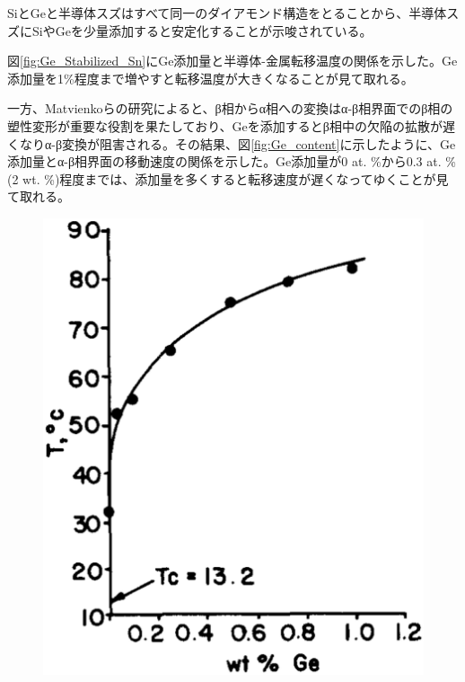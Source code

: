 SiとGeと半導体スズはすべて同一のダイアモンド構造をとることから、半導体スズにSiやGeを少量添加すると安定化することが示唆されている\cite{Ewald1954,Gallerneault1983}。

図\ref{fig:Ge_Stabilized_Sn}にGe添加量と半導体-金属転移温度の関係を示した\cite{Vnuk1984}。Ge添加量を1\%程度まで増やすと転移温度が大きくなることが見て取れる。

一方、Matvienkoらの研究\cite{Matvienko}によると、β相からα相への変換はα-β相界面でのβ相の塑性変形が重要な役割を果たしており、Geを添加するとβ相中の欠陥の拡散が遅くなりα-β変換が阻害される。その結果、図\ref{fig:Ge_content}に示したように、Ge添加量とα-β相界面の移動速度の関係を示した\cite{Matvienko}。Ge添加量が0 at. \%から0.3 at. \%(2 wt. \%)程度までは、添加量を多くすると転移速度が遅くなってゆくことが見て取れる。
\begin{figure}[!h]
 \begin{minipage}{0.4\hsize}
    \begin{center}
   \includegraphics[width=\hsize]{Introduction/Ge_Stabilized_Sn.eps}
  \end{center}

\end{minipage}
\end{figure}
